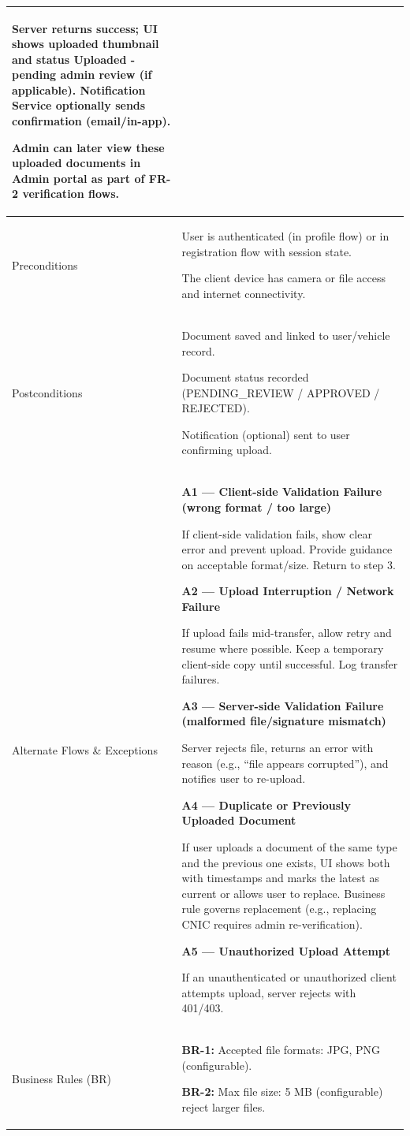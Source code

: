 \begin{longtable}{|p{3.5cm}|p{12cm}|}
Server returns success; UI shows uploaded thumbnail and status Uploaded - pending admin review (if applicable). Notification Service optionally sends confirmation (email/in-app).

Admin can later view these uploaded documents in Admin portal as part of FR-2 verification flows. \\
\hline
Preconditions & 
User is authenticated (in profile flow) or in registration flow with session state.

The client device has camera or file access and internet connectivity. \\
\hline
Postconditions & 
Document saved and linked to user/vehicle record.

Document status recorded (PENDING\_REVIEW / APPROVED / REJECTED).

Notification (optional) sent to user confirming upload. \\
\hline
Alternate Flows \& Exceptions & 
\textbf{A1 --- Client-side Validation Failure (wrong format / too large)}

If client-side validation fails, show clear error and prevent upload. Provide guidance on acceptable format/size. Return to step 3.

\textbf{A2 --- Upload Interruption / Network Failure}

If upload fails mid-transfer, allow retry and resume where possible. Keep a temporary client-side copy until successful. Log transfer failures.

\textbf{A3 --- Server-side Validation Failure (malformed file/signature mismatch)}

Server rejects file, returns an error with reason (e.g., ``file appears corrupted''), and notifies user to re-upload.

\textbf{A4 --- Duplicate or Previously Uploaded Document}

If user uploads a document of the same type and the previous one exists, UI shows both with timestamps and marks the latest as current or allows user to replace. Business rule governs replacement (e.g., replacing CNIC requires admin re-verification).

\textbf{A5 --- Unauthorized Upload Attempt}

If an unauthenticated or unauthorized client attempts upload, server rejects with 401/403. \\
\hline
Business Rules (BR) & 
\textbf{BR-1:} Accepted file formats: JPG, PNG (configurable).

\textbf{BR-2:} Max file size: 5 MB (configurable) reject larger files.


\end{longtable}
